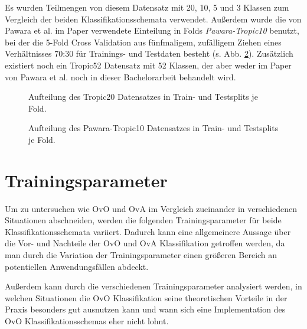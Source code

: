 Es wurden Teilmengen von diesem Datensatz mit 20, 10, 5 und 3 Klassen zum Vergleich der beiden Klassifikationsschemata verwendet. Außerdem wurde die von Pawara et al. im Paper \cite{pawaraPaper} verwendete Einteilung in Folds \textit{Pawara-Tropic10} \cite{pawaraWebsiteDatensaetze} benutzt, bei der die 5-Fold Cross Validation aus fünfmaligem, zufälligem Ziehen eines Verhältnisses 70:30 für Trainings- und Testdaten besteht (s. Abb. \ref{fig:pawaraTropic10Zusammensetzung}).
Zusätzlich existiert noch ein Tropic52 Datensatz \cite{pawaraWebsiteDatensaetze} mit 52 Klassen, der aber weder im Paper von Pawara et al. \cite{pawaraPaper} noch in dieser Bachelorarbeit behandelt wird.

\begin{figure}[H]
\begin{adjustbox}{width=1.4\textwidth, center}

\end{adjustbox}
\caption{Aufteilung des Tropic20 Datensatzes \cite{pawaraWebsiteDatensaetze} in Train- und Testsplits je Fold.}
\label{fig:tropic20Zusammensetzung}
\end{figure}
\begin{figure}[H]
\begin{adjustbox}{width=1.4\textwidth, center}

\end{adjustbox}
\caption{Aufteilung des Pawara-Tropic10 Datensatzes \cite{pawaraWebsiteDatensaetze} in Train- und Testsplits je Fold.}
\label{fig:pawaraTropic10Zusammensetzung}
\end{figure}


\section{Trainingsparameter}
\label{ch:methodik_parameter}
Um zu untersuchen wie OvO und OvA im Vergleich zueinander in verschiedenen Situationen abschneiden, werden die folgenden Trainingsparameter für beide Klassifikationsschemata variiert.
Dadurch kann eine allgemeinere Aussage über die Vor- und Nachteile der OvO und OvA Klassifikation getroffen werden, da man durch die Variation der Trainingsparameter einen größeren Bereich an potentiellen Anwendungsfällen abdeckt.

Außerdem kann durch die verschiedenen Trainingsparameter analysiert werden, in welchen Situationen die OvO Klassifikation seine theoretischen Vorteile in der Praxis besonders gut ausnutzen kann und wann sich eine Implementation des OvO Klassifikationsschemas eher nicht lohnt.


